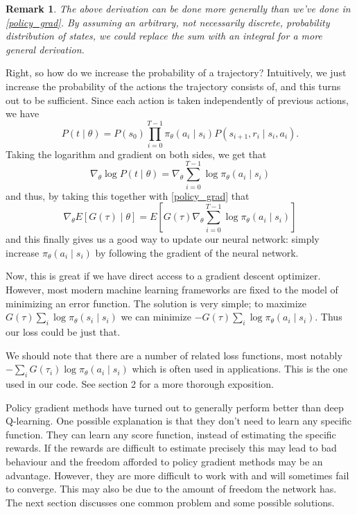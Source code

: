 \documentclass{article}
\theoremstyle{changedot}
\theoremstyle{changedotbreak}
\theoremstyle{nonumberplain}
\newtheorem{remark}{Remark}
\begin{document}
\begin{remark}
  The above derivation can be done more generally than we've done in \ref{policy_grad}. By assuming an arbitrary, not necessarily discrete, probability distribution of states, we could replace the sum with an integral for a more general derivation.
\end{remark}

Right, so how do we increase the probability of a trajectory? Intuitively, we just increase the probability of the actions the trajectory consists of, and this turns out to be sufficient. Since each action is taken independently of previous actions, we have \[P(t \mid \theta) = P(s_{0}) \prod_{i=0}^{T-1} \pi_{\theta}(a_{i} \mid s_{i}) P(s_{i+1}, r_{i} \mid s_{i}, a_{i}).\] Taking the logarithm and gradient on both sides, we get that \[\nabla_{\theta} \log P(t \mid \theta) = \nabla_{\theta} \sum_{i=0}^{T-1} \log \pi_{\theta}(a_{i} \mid s_{i})\] and thus, by taking this together with \ref{policy_grad} that \[\nabla_{\theta} E[G(\tau) \mid \theta] = E\left[ G(\tau) \nabla_{\theta} \sum_{i=0}^{T-1} \log \pi_{\theta} (a_{i} \mid s_{i}) \right]\] and this finally gives us a good way to update our neural network: simply increase $\pi_{\theta} (a_{i} \mid s_{i})$ by following the gradient of the neural network.


Now, this is great if we have direct access to a gradient descent optimizer. However, most modern machine learning frameworks are fixed to the model of minimizing an error function. The solution is very simple; to maximize $G(\tau) \sum_{i} \log \pi_{\theta} (s_{i} \mid s_{i})$ we can minimize $-G(\tau) \sum_{i} \log \pi_{\theta} (a_{i} \mid s_{i})$. Thus our loss could be just that.%

We should note that there are a number of related loss functions, most notably $-\sum_{i} G(\tau_{i}) \log \pi_{\theta}(a_{i} \mid s_{i})$ which is often used in applications. This is the one used in our code. See \cite{GAE} section 2 for a more thorough exposition.

Policy gradient methods have turned out to generally perform better than deep Q-learning. One possible explanation is that they don't need to learn any specific function. They can learn any score function, instead of estimating the specific rewards. If the rewards are difficult to estimate precisely this may lead to bad behaviour and the freedom afforded to policy gradient methods may be an advantage. However, they are more difficult to work with and will sometimes fail to converge. This may also be due to the amount of freedom the network has. The next section discusses one common problem and some possible solutions.
\end{document}
